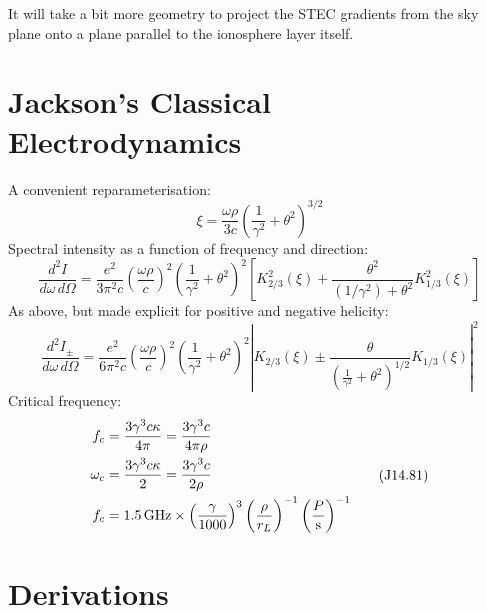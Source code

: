 \documentclass{book}
\begin{document}
It will take a bit more geometry to project the STEC gradients from the sky plane onto a plane parallel to the ionosphere layer itself.

\chapter{Jackson's Classical Electrodynamics}

A convenient reparameterisation:
\begin{equation}
    \xi = \frac{\omega\rho}{3c}\left(\frac{1}{\gamma^2} + \theta^2\right)^{3/2}
    \tag{J14.76}
\end{equation}
Spectral intensity as a function of frequency and direction:
\begin{equation}
    \frac{d^2I}{d\omega\,d\Omega} =
        \frac{e^2}{3\pi^2c}
        \left( \frac{\omega\rho}{c} \right)^2
        \left( \frac{1}{\gamma^2} + \theta^2 \right)^2
        \left[ K_{2/3}^2(\xi) + \frac{\theta^2}{(1/\gamma^2) + \theta^2} K_{1/3}^2(\xi) \right]
    \tag{J14.79}
\end{equation}
As above, but made explicit for positive and negative helicity:
\begin{equation}
    \frac{d^2I_\pm}{d\omega\,d\Omega} =
        \frac{e^2}{6\pi^2c}
        \left( \frac{\omega\rho}{c} \right)^2
        \left( \frac{1}{\gamma^2} + \theta^2 \right)^2
        \left| K_{2/3}(\xi) \pm \frac{\theta}{\left(\frac{1}{\gamma^2} + \theta^2\right)^{1/2}} K_{1/3}(\xi) \right|^2
    \tag{J Problem 14.25}
    \label{eqn:JP14_25}
\end{equation}
Critical frequency:
\begin{equation}
    \begin{aligned}
        f_c &= \frac{3\gamma^3 c\kappa}{4\pi}
             = \frac{3\gamma^3 c}{4\pi\rho} \\
        \omega_c &= \frac{3\gamma^3 c\kappa}{2}
                  = \frac{3\gamma^3 c}{2\rho} \\
        f_c &= 1.5\text{\,GHz} \times \left(\frac{\gamma}{1000}\right)^3 \left(\frac{\rho}{r_L}\right)^{-1} \left(\frac{P}{\text{s}}\right)^{-1}
    \end{aligned}
    \tag{J14.81}
\end{equation}

\appendix

\chapter{Derivations}
\end{document}
